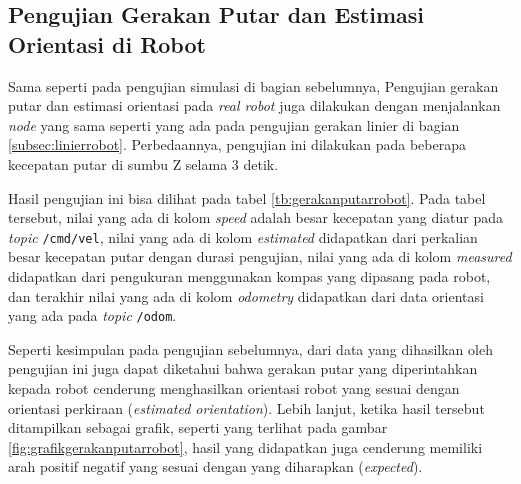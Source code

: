 \subsection{Pengujian Gerakan Putar dan Estimasi Orientasi di Robot}
\label{subsec:putarrobot}

Sama seperti pada pengujian simulasi di bagian sebelumnya,
  Pengujian gerakan putar dan estimasi orientasi pada \emph{real robot} juga dilakukan dengan menjalankan \emph{node} yang sama seperti yang ada pada pengujian gerakan linier di bagian \ref{subsec:linierrobot}.
Perbedaannya, pengujian ini dilakukan pada beberapa kecepatan putar di sumbu Z selama 3 detik.

Hasil pengujian ini bisa dilihat pada tabel \ref{tb:gerakanputarrobot}.
Pada tabel tersebut, nilai yang ada di kolom \emph{speed} adalah besar kecepatan yang diatur pada \emph{topic} \lstinline{/cmd/vel},
  nilai yang ada di kolom \emph{estimated} didapatkan dari perkalian besar kecepatan putar dengan durasi pengujian,
  nilai yang ada di kolom \emph{measured} didapatkan dari pengukuran menggunakan kompas yang dipasang pada robot,
  dan terakhir nilai yang ada di kolom \emph{odometry} didapatkan dari data orientasi yang ada pada \emph{topic} \lstinline{/odom}.



Seperti kesimpulan pada pengujian sebelumnya,
  dari data yang dihasilkan oleh pengujian ini juga dapat diketahui bahwa gerakan putar yang diperintahkan kepada robot cenderung menghasilkan orientasi robot yang sesuai dengan orientasi perkiraan (\emph{estimated orientation}).
Lebih lanjut, ketika hasil tersebut ditampilkan sebagai grafik,
  seperti yang terlihat pada gambar \ref{fig:grafikgerakanputarrobot},
  hasil yang didapatkan juga cenderung memiliki arah positif negatif yang sesuai dengan yang diharapkan (\emph{expected}).


